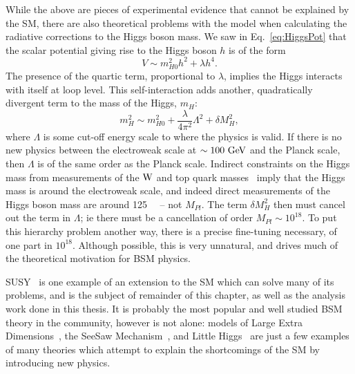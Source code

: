 While the above are pieces of experimental evidence that cannot be explained by the \ac{SM}, 
there are also theoretical problems with the model when calculating the radiative corrections to the Higgs boson mass.
We saw in Eq.~\ref{eq:HiggsPot} that the scalar potential giving rise to the Higgs boson $h$ is of the form
\begin{equation}
V \sim m_{H0}^{2} h^{2} + \lambda h^{4}.
\end{equation}
The presence of the quartic term, proportional to $\lambda$, implies the Higgs interacts with itself at loop level. 
This self-interaction adds another, quadratically divergent term to the mass of the Higgs, $m_{H}$:
\begin{equation}
m_{H}^{2} \sim m_{H0}^{2} + \frac{\lambda}{4 \pi ^{2}} \Lambda^{2} + \delta M_{H}^{2},
\label{oneloopHiggsMass}
\end{equation}
where $\Lambda$ is some cut-off energy scale to where the physics is valid.
If there is no new physics between the electroweak scale at $\sim 100~\mathrm{GeV}$ and the Planck scale, then $\Lambda$ is of the same order as the Planck scale.
Indirect constraints on the Higgs mass from measurements of the $\mathrm{W}$ and top quark masses~\cite{higgsMassConstraint1,higgsMassConstraint2} imply that the Higgs mass is around the electroweak scale, and indeed direct measurements of the Higgs boson mass are around 125~\GeV~\cite{HiggsLegacyCMS,HiggsLegacyATLAS} -- not $M_{Pl}$.
The term $\delta M_{H}^{2}$ then must cancel out the term in $\Lambda$; ie there must be a cancellation of order $M_{Pl} \sim 10^{18}$.
To put this hierarchy problem another way, there is a precise fine-tuning necessary, of one part in $10^{18}$.
Although possible, this is very unnatural, and drives  much of the theoretical motivation for \ac{BSM} physics.



\ac{SUSY}~\cite{susyMot1,susyMot2} is one example of an extension to the \ac{SM} which can solve many of its problems, and is the subject of  remainder of this chapter, as well as the analysis work done in this thesis. 
It is probably the most popular and well studied \ac{BSM} theory in the community, however is not alone: models of
Large Extra Dimensions~\cite{ADDextraDimensions}, the 
SeeSaw Mechanism~\cite{seesawMech1,seesawMech2}, and
Little Higgs~\cite{LittleHiggsRev}
are just a few examples of many theories which attempt to explain the shortcomings of the \ac{SM} by introducing new physics.



